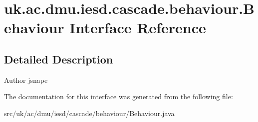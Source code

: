 \hypertarget{interfaceuk_1_1ac_1_1dmu_1_1iesd_1_1cascade_1_1behaviour_1_1_behaviour}{\section{uk.\-ac.\-dmu.\-iesd.\-cascade.\-behaviour.\-Behaviour Interface Reference}
\label{interfaceuk_1_1ac_1_1dmu_1_1iesd_1_1cascade_1_1behaviour_1_1_behaviour}
}


\subsection{Detailed Description}
\begin{DoxyAuthor}{Author}
jsnape 
\end{DoxyAuthor}


The documentation for this interface was generated from the following file\-:\begin{DoxyCompactItemize}
\item 
src/uk/ac/dmu/iesd/cascade/behaviour/Behaviour.\-java\end{DoxyCompactItemize}
